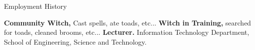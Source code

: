 \begin{rubric}{Employment History}

\entry*[2014 -- ]%
	\textbf{Community Witch,} Cast spells, ate toads, etc...
\entry*[2012 -- 2014]%
	\textbf{Witch in Training,} searched for toads, cleaned brooms, etc...
%
%
\entry*[2013 -- 2015]%
	\textbf{Lecturer.} Information Technology Department, School of Engineering, Science and Technology.
%
\end{rubric}